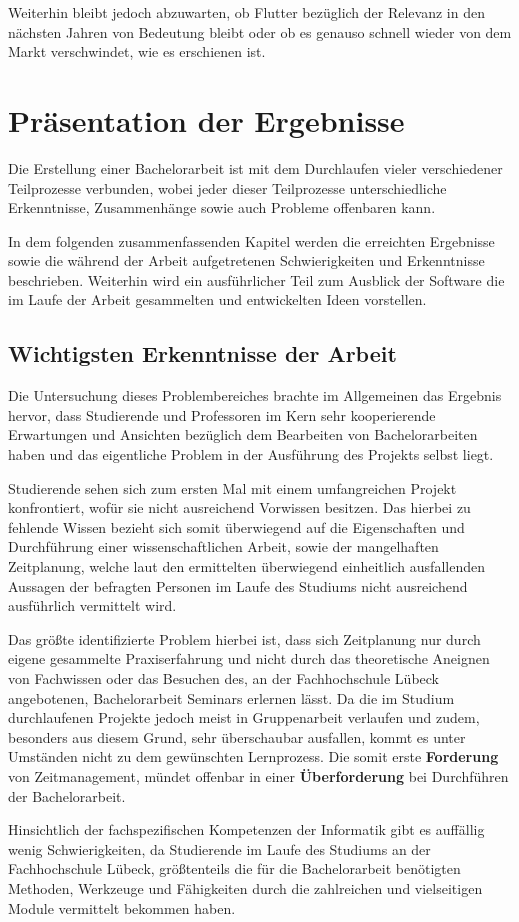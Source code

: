 \documentclass[bibliography=totoc,listof=totoc,BCOR=5mm,DIV=12,oneside]{scrbook}
\begin{document}
\par \bigskip Weiterhin bleibt jedoch abzuwarten, ob Flutter bezüglich der Relevanz in den nächsten Jahren von Bedeutung bleibt oder ob es genauso schnell wieder von dem Markt verschwindet, wie es erschienen ist.


\chapter{Präsentation der Ergebnisse} \label{chap:ergebnisse}
\par Die Erstellung einer Bachelorarbeit ist mit dem Durchlaufen vieler verschiedener Teilprozesse verbunden, wobei jeder dieser Teilprozesse unterschiedliche Erkenntnisse, Zusammenhänge sowie auch Probleme offenbaren kann.
\par In dem folgenden zusammenfassenden Kapitel werden die erreichten Ergebnisse sowie die während der Arbeit aufgetretenen Schwierigkeiten und Erkenntnisse beschrieben. Weiterhin wird ein ausführlicher Teil zum Ausblick der Software die im Laufe der Arbeit gesammelten und entwickelten Ideen vorstellen.

\section{Wichtigsten Erkenntnisse der Arbeit}
Die Untersuchung dieses Problembereiches brachte im Allgemeinen das Ergebnis hervor, dass Studierende und Professoren im Kern sehr kooperierende Erwartungen und Ansichten bezüglich dem Bearbeiten von Bachelorarbeiten haben und das eigentliche Problem in der Ausführung des Projekts selbst liegt. 

\par \bigskip Studierende sehen sich zum ersten Mal mit einem umfangreichen Projekt konfrontiert, wofür sie nicht ausreichend Vorwissen besitzen. Das hierbei zu fehlende Wissen bezieht sich somit überwiegend auf die Eigenschaften und Durchführung einer wissenschaftlichen Arbeit, sowie der mangelhaften Zeitplanung, welche laut den ermittelten überwiegend einheitlich ausfallenden Aussagen der befragten Personen im Laufe des Studiums nicht ausreichend ausführlich vermittelt wird. 
\par Das größte identifizierte Problem hierbei ist, dass sich Zeitplanung nur durch eigene gesammelte Praxiserfahrung und nicht durch das theoretische Aneignen von Fachwissen oder das Besuchen des, an der Fachhochschule Lübeck angebotenen, Bachelorarbeit Seminars erlernen lässt. Da die im Studium durchlaufenen Projekte jedoch meist in Gruppenarbeit verlaufen und zudem, besonders aus diesem Grund, sehr überschaubar ausfallen, kommt es unter Umständen nicht zu dem gewünschten Lernprozess. Die somit erste \textbf{Forderung} von Zeitmanagement, mündet offenbar in einer \textbf{Überforderung} bei Durchführen der Bachelorarbeit.
\par Hinsichtlich der fachspezifischen Kompetenzen der Informatik gibt es auffällig wenig Schwierigkeiten, da Studierende im Laufe des Studiums an der Fachhochschule Lübeck, größtenteils die für die Bachelorarbeit benötigten Methoden, Werkzeuge und Fähigkeiten durch die zahlreichen und vielseitigen Module vermittelt bekommen haben.
\end{document}
